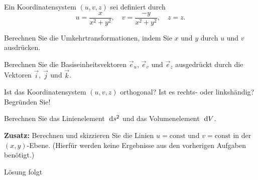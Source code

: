 \documentclass{atistandalonetask}
\begin{document}
  \begin{atiTask}[
    title = Koordinatentransformation
  ]

Ein Koordinatensystem $(u,v,z)$ sei definiert durch
\[
u=\frac{x}{x^2+y^2},\quad v=\frac{-y}{x^2+y^2},\quad z=z.
\]
	\begin{atiSubtasks}
		\item Berechnen Sie die Umkehrtransformationen, indem Sie $x$ und $y$ durch $u$ und $v$ ausdrücken.
		\item Berechnen Sie die Basiseinheitsvektoren $\vec{e}_u$, $\vec{e}_v$ und $\vec{e}_z$ ausgedrückt durch die Vektoren $\vec{i}$, $\vec{j}$ und $\vec{k}$.
		\item Ist das Koordinatensystem $(u,v,z)$ orthogonal? Ist es rechts- oder linkshändig? Begründen Sie!
		\item Berechnen Sie das Linienelement $\;\mathrm{d} s^2$ und das Volumenelement $\;\mathrm{d} V$.
		\item \textbf{Zusatz:} Berechnen und skizzieren Sie die Linien $u=\text{const}$ und $v=\text{const}$ in der $(x,y)$-Ebene. (Hierfür werden keine Ergebnisse aus den vorherigen Aufgaben benötigt.)
	\end{atiSubtasks} 
  \end{atiTask}
  \begin{atiSolution}
  Lösung folgt
  \end{atiSolution}
\end{document}
